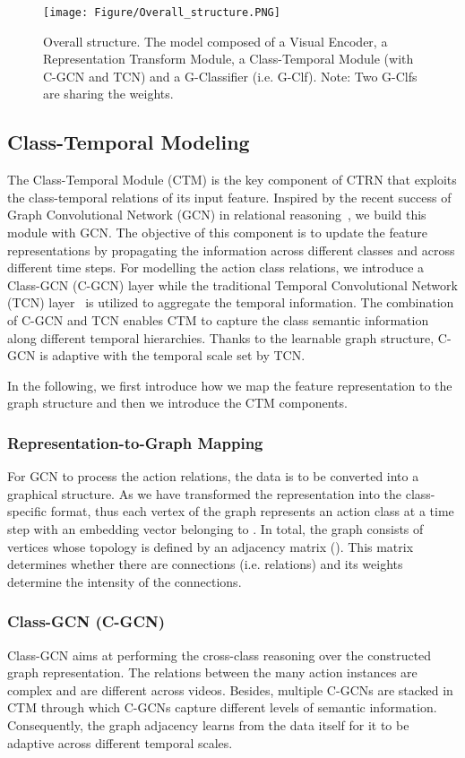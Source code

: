 \documentclass{bmvc2k}
\begin{document}
\begin{figure*}[t]
\centering
\texttt{[image: Figure/Overall\_structure.PNG]}
\caption{Overall structure. The model composed of a Visual 
Encoder, a Representation Transform Module, a Class-Temporal Module (with C-GCN and TCN) and a G-Classifier (i.e. G-Clf). Note: Two G-Clfs are sharing the weights. }
\label{Fig:overall}
\end{figure*}

\subsection{Class-Temporal Modeling}
The Class-Temporal Module (CTM) is the key component of CTRN that exploits the class-temporal relations of its input feature. Inspired by the recent success of Graph Convolutional Network (GCN) in relational reasoning~\cite{kipf2016semi,PGCN2019ICCV,gtad,huang2020improving}, we build this module with GCN.  
The objective of this component is to update the feature representations by propagating the information across different classes and across different time steps. 
For modelling the action class relations, we introduce a Class-GCN (C-GCN) layer while the traditional Temporal Convolutional Network (TCN) layer~\cite{lea2017temporal} is utilized to aggregate the temporal information. 
The combination of C-GCN and TCN enables CTM to capture the class semantic information along different temporal hierarchies. Thanks to the learnable graph structure, C-GCN is adaptive with the temporal scale set by TCN. 


In the following, we first introduce how we map the feature representation to the graph structure and then we introduce the CTM components.

\subsubsection{Representation-to-Graph Mapping} 
\label{sec:R2G}
For GCN to process the action relations, the data is to be converted into a graphical structure.
As we have transformed the representation into the class-specific format, thus each vertex of the graph represents an action class at a time step with an embedding vector belonging to . 
In total, the graph consists of  vertices whose topology is defined by an adjacency matrix (). This matrix determines whether there are connections (i.e. relations) and its weights determine the intensity of the connections.


\subsubsection{Class-GCN (C-GCN)}
Class-GCN aims at performing the cross-class reasoning over the constructed graph representation. 
The relations between the many action instances are complex and are different across videos. Besides, multiple C-GCNs are stacked in CTM through which C-GCNs capture different levels of semantic information. 
Consequently, the graph adjacency  learns from the data itself for it to be adaptive across different temporal scales. 
\end{document}
